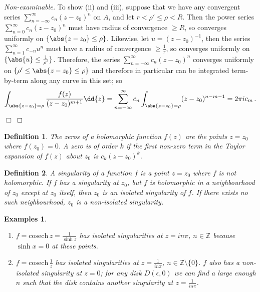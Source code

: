 \documentclass{article}
\theoremstyle{plain}\theoremheaderfont{\normalfont\itshape}\theorembodyfont{\rmfamily}\theoremseparator{.}\newtheorem*{rem}{Remark}\newtheorem*{ex}{Example}\newtheorem*{proof}{Proof}\newtheorem*{altp}{Alternative proof}
\theoremstyle{plain}\theoremheaderfont{\normalfont\bfseries}\theorembodyfont{\rmfamily}\theoremseparator{.}\newtheorem{thm}{Theorem}[section]\newtheorem{lem}[thm]{Lemma}\newtheorem{prop}[thm]{Proposition}\newtheorem*{cor}{Corollary}\newtheorem{defn}[thm]{Definition}\newtheorem{clm}[thm]{Claim}\newtheorem{clminproof}{Claim}
\theoremstyle{break}\theoremheaderfont{\normalfont\itshape}\theorembodyfont{\rmfamily}\theoremseparator{.\medskip}\newtheorem*{proofskip}{Proof}\newtheorem*{exs}{Examples}\newtheorem*{rems}{Remarks}
\theoremstyle{break}\theoremheaderfont{\normalfont\bfseries}\theorembodyfont{\rmfamily}\theoremseparator{.\medskip}\newtheorem{lemskip}[thm]{Lemma}\newtheorem{defnskip}[thm]{Definition}\newtheorem{propskip}[thm]{Proposition}\newtheorem{thmskip}[thm]{Theorem}
\numberwithin{equation}{section}
\newcommand{\qed}{\hfill\ensuremath{\Box}}
\begin{document}
\begin{proof}[Non-examinable]
		To show (ii) and (iii), suppose that we have any convergent series \(\sum_{n=-\infty}^{\infty} c_n(z-z_0)^n\) on \(A\),  and let \(r<\rho'\le\rho<R\). Then the power series \(\sum_{n=0}^{\infty}c_n(z-z_0)^n\) must have radius of convergence \(\ge R\), so converges uniformly on \(\{\abs{z-z_0}\le\rho\}\). Likewise, let \(u=(z-z_0)^{-1}\), then the series \(\sum_{n=1}^{\infty}c_{-n}u^n\) must have a radius of convergence \(\ge\frac{1}{r}\), so converges uniformly on \(\{\abs{u}\le\frac{1}{\rho'}\}\). Therefore, the series \(\sum_{n=-\infty}^{\infty} c_n(z-z_0)^n\) converges uniformly on \(\{\rho'\le\abs{z-z_0}\le\rho\}\) and therefore in particular can be integrated term-by-term along any curve in this set; so
		\[\int_{\abs{z-z_0}=\rho}\frac{f(z)}{(z-z_0)^{m+1}}\dd{z}=\sum_{n=-\infty}^{\infty}c_n\int_{\abs{z-z_0}=\rho}(z-z_0)^{n-m-1}=2\pi i c_m\,.\]\qed
	\end{proof}
	\begin{defn}
		The \textit{zeros} of a holomorphic function \(f(z)\) are the points \(z=z_0\) where \(f(z_0)=0\). A zero is of \textit{order} \(k\) if the first non-zero term in the Taylor expansion of \(f(z)\) about \(z_0\) is \(c_k(z-z_0)^k\).
	\end{defn}
	\begin{defn}
		A \textit{singularity} of a function \(f\) is a point \(z=z_0\) where \(f\) is not holomorphic. If \(f\) has a singularity at \(z_0\), but \(f\) is holomorphic in a neighbourhood of \(z_0\) except at \(z_0\) itself, then \(z_0\) is an \textit{isolated singularity} of \(f\). If there exists no such neighbourhood, \(z_0\) is a non-isolated singularity.
	\end{defn}
	\begin{exs}
		\begin{enumerate}[topsep=0pt,label=(\roman*)]
			\item \(f=\mathrm{cosech}\,z=\frac{1}{\sinh z}\) has isolated singularities at \(z=in\pi\), \(n\in\mathbb{Z}\) because \(\sinh x=0\) at these points.
			\item \(f=\mathrm{cosech}\,\frac{1}{z}\) has isolated singularities at \(z=\frac{1}{in\pi}\), \(n\in\mathbb{Z}\setminus\{0\}\). \(f\) also has a non-isolated singularity at \(z=0\); for any disk \(D(\epsilon,0)\) we can find a large enough \(n\) such that the disk contains another singularity at \(z=\frac{1}{in\pi}\).
		\end{enumerate}
	\end{exs}
\end{document}

